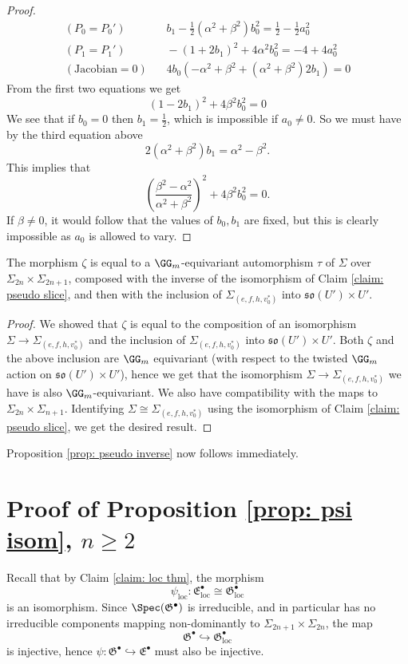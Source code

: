 \documentclass[11pt]{article}
\begin{document}
\begin{proof}
\[\begin{aligned}
        (P_0=P_0')&\ \ \ \ b_1-\frac{1}{2}(\alpha^2+\beta^2)b_0^2 = \frac{1}{2}-\frac{1}{2}a_0^2\\
        (P_1=P_1')&\ \ \ \ -(1+2b_1)^2+4\alpha^2b_0^2 = -4+4a_0^2\\
        (\mathrm{Jacobian}=0)&\ \ \ \ 4b_0(-\alpha^2+\beta^2+(\alpha^2+\beta^2)2b_1)=0
    \end{aligned}
    \]
    From the first two equations we get
    $$(1-2b_1)^2 + 4\beta^2b_0^2 = 0$$
    We see that if $b_0=0$ then $b_1=\frac{1}{2}$, which is impossible if $a_0\neq 0$. So we must have by the third equation above
    $$2(\alpha^2+\beta^2)b_1 = \alpha^2-\beta^2.$$
    This implies that
    $$\left(\frac{\beta^2-\alpha^2}{\alpha^2+\beta^2}\right)^2 + 4\beta^2b_0^2 = 0.$$
    If $\beta\neq 0$, it would follow that the values of $b_0, b_1$ are fixed, but this is clearly impossible as $a_0$ is allowed to vary.
\end{proof}
\begin{corollary}
The morphism $\zeta$ is equal to a $\GG_m$-equivariant automorphism $\tau$ of $\Sigma$ over $\Sigma_{2n}\times \Sigma_{2n+1}$, composed with the inverse of the isomorphism of Claim \ref{claim: pseudo slice}, and then with the inclusion of $\Sigma_{(e, f, h, v_0^*)}$ into $\mathfrak{so}(U')\times U'$.
\end{corollary}
\begin{proof}
    We showed that $\zeta$ is equal to the composition of an isomorphism $\Sigma\to \Sigma_{(e, f, h, v_0^*)}$ and the inclusion of $\Sigma_{(e, f, h, v_0^*)}$ into $\mathfrak{so}(U')\times U'$. Both $\zeta$ and the above inclusion are $\GG_m$ equivariant (with respect to the twisted $\GG_m$ action on $\mathfrak{so}(U')\times U'$), hence we get that the isomorphism $\Sigma\to \Sigma_{(e, f, h, v_0^*)}$ we have is also $\GG_m$-equivariant.
    We also have compatibility with the maps to $\Sigma_{2n}\times \Sigma_{n+1}$.
    Identifying $\Sigma\cong \Sigma_{(e, f, h, v_0^*)}$ using the isomorphism of Claim \ref{claim: pseudo slice}, we get the desired result.
\end{proof}
Proposition \ref{prop: pseudo inverse} now follows immediately.
\section{Proof of Proposition \ref{prop: psi isom}, $n\geq 2$}\label{sec: conclusion}
Recall that by Claim \ref{claim: loc thm}, the morphism
$$\psi_\mathrm{loc}:\mathfrak{E}^\bullet_\mathrm{loc}\cong\mathfrak{G}^\bullet_\mathrm{loc}$$ is an isomorphism.
Since $\Spec(\mathfrak{G}^\bullet)$ is irreducible, and in particular has no irreducible components mapping non-dominantly to $\Sigma_{2n+1}\times \Sigma_{2n}$, the map
$$\mathfrak{G}^\bullet\hookrightarrow\mathfrak{G}^\bullet_\mathrm{loc}$$ is injective, hence $\psi:\mathfrak{G}^\bullet\hookrightarrow \mathfrak{E}^\bullet$ must also be injective.
\end{document}
